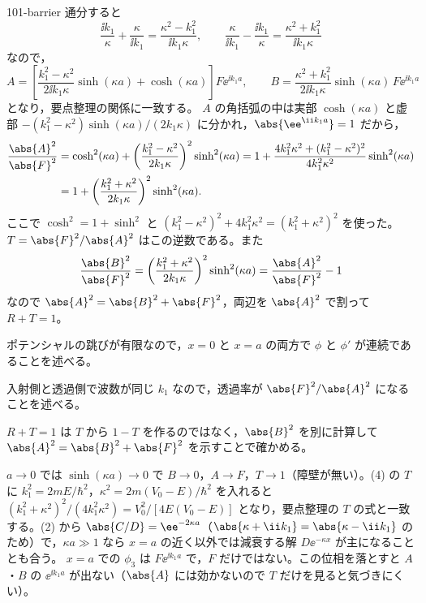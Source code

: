 \documentclass[uplatex,dvipdfmx,a4paper,11pt]{jsarticle}
\begin{document}
\begin{kaisetsu}{101-barrier}
通分すると
\[ \frac{\ii k_{1}}{\kappa}+\frac{\kappa}{\ii k_{1}}=\frac{\kappa^{2}-k_{1}^{2}}{\ii k_{1}\kappa},\qquad \frac{\kappa}{\ii k_{1}}-\frac{\ii k_{1}}{\kappa}=\frac{\kappa^{2}+k_{1}^{2}}{\ii k_{1}\kappa} \]
なので，
\[ A=\left[\frac{k_{1}^{2}-\kappa^{2}}{2\ii k_{1}\kappa}\sinh(\kappa a)+\cosh(\kappa a)\right]F\ee^{\ii k_{1}a},\qquad B=\frac{\kappa^{2}+k_{1}^{2}}{2\ii k_{1}\kappa}\sinh(\kappa a)\,F\ee^{\ii k_{1}a} \]
となり，要点整理の関係に一致する。
 $A$ の角括弧の中は実部 $\cosh(\kappa a)$ と虚部 $-(k_{1}^{2}-\kappa^{2})\sinh(\kappa a)/(2k_{1}\kappa)$ に分かれ，$\abs{\ee^{\ii k_{1}a}}=1$ だから，
\begin{align*}
  \frac{\abs{A}^{2}}{\abs{F}^{2}}
  &=\cosh^{2}(\kappa a)+\left(\frac{k_{1}^{2}-\kappa^{2}}{2k_{1}\kappa}\right)^{2}\sinh^{2}(\kappa a)
   =1+\frac{4k_{1}^{2}\kappa^{2}+(k_{1}^{2}-\kappa^{2})^{2}}{4k_{1}^{2}\kappa^{2}}\sinh^{2}(\kappa a)\\
  &=1+\left(\frac{k_{1}^{2}+\kappa^{2}}{2k_{1}\kappa}\right)^{2}\sinh^{2}(\kappa a) .
\end{align*}
ここで $\cosh^{2}=1+\sinh^{2}$ と $(k_{1}^{2}-\kappa^{2})^{2}+4k_{1}^{2}\kappa^{2}=(k_{1}^{2}+\kappa^{2})^{2}$ を使った。$T=\abs{F}^{2}/\abs{A}^{2}$ はこの逆数である。また
\[ \frac{\abs{B}^{2}}{\abs{F}^{2}}=\left(\frac{k_{1}^{2}+\kappa^{2}}{2k_{1}\kappa}\right)^{2}\sinh^{2}(\kappa a)=\frac{\abs{A}^{2}}{\abs{F}^{2}}-1 \]
なので $\abs{A}^{2}=\abs{B}^{2}+\abs{F}^{2}$，両辺を $\abs{A}^{2}$ で割って $R+T=1$。
\begin{ronten}
  \item {} ポテンシャルの跳びが有限なので，$x=0$ と $x=a$ の両方で $\phi$ と $\phi'$ が連続であることを述べる。
  \item {} 入射側と透過側で波数が同じ $k_{1}$ なので，透過率が $\abs{F}^{2}/\abs{A}^{2}$ になることを述べる。
  \item {} $R+T=1$ は $T$ から $1-T$ を作るのではなく，$\abs{B}^{2}$ を別に計算して $\abs{A}^{2}=\abs{B}^{2}+\abs{F}^{2}$ を示すことで確かめる。
\end{ronten}
\kenzan $a\to0$ では $\sinh(\kappa a)\to0$ で $B\to0$，$A\to F$，$T\to1$（障壁が無い）。(4) の $T$ に $k_{1}^{2}=2mE/\hbar^{2}$，$\kappa^{2}=2m(V_{0}-E)/\hbar^{2}$ を入れると $(k_{1}^{2}+\kappa^{2})^{2}/(4k_{1}^{2}\kappa^{2})=V_{0}^{2}/[4E(V_{0}-E)]$ となり，要点整理の $T$ の式と一致する。(2) から $\abs{C/D}=\ee^{-2\kappa a}$（$\abs{\kappa+\ii k_{1}}=\abs{\kappa-\ii k_{1}}$ のため）で，$\kappa a\gg1$ なら $x=a$ の近く以外では減衰する解 $D\ee^{-\kappa x}$ が主になることとも合う。
\tsumazuki $x=a$ での $\phi_{3}$ は $F\ee^{\ii k_{1}a}$ で，$F$ だけではない。この位相を落とすと $A$・$B$ の $\ee^{\ii k_{1}a}$ が出ない（$\abs{A}$ には効かないので $T$ だけを見ると気づきにくい）。
\end{kaisetsu}
\end{document}
